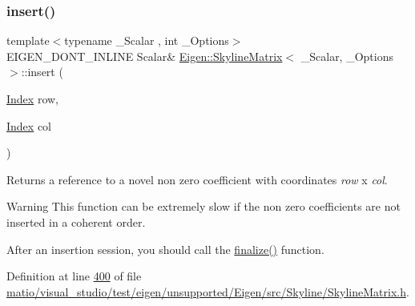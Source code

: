 \subsubsection{\texorpdfstring{insert()}{insert()}\hspace{0.1cm}{\footnotesize\ttfamily [1/2]}}
{\footnotesize\ttfamily template$<$typename \+\_\+\+Scalar , int \+\_\+\+Options$>$ \\
E\+I\+G\+E\+N\+\_\+\+D\+O\+N\+T\+\_\+\+I\+N\+L\+I\+NE Scalar\& \hyperlink{class_eigen_1_1_skyline_matrix}{Eigen\+::\+Skyline\+Matrix}$<$ \+\_\+\+Scalar, \+\_\+\+Options $>$\+::insert (\begin{DoxyParamCaption}\item[{\hyperlink{group___core___module_a554f30542cc2316add4b1ea0a492ff02}{Index}}]{row,  }\item[{\hyperlink{group___core___module_a554f30542cc2316add4b1ea0a492ff02}{Index}}]{col }\end{DoxyParamCaption})\hspace{0.3cm}{\ttfamily [inline]}}

\begin{DoxyReturn}{Returns}
a reference to a novel non zero coefficient with coordinates {\itshape row} x {\itshape col}.
\end{DoxyReturn}
\begin{DoxyWarning}{Warning}
This function can be extremely slow if the non zero coefficients are not inserted in a coherent order.
\end{DoxyWarning}
After an insertion session, you should call the \hyperlink{class_eigen_1_1_skyline_matrix_a1269310d041fb3ca2a980644f3cfe5a2}{finalize()} function. 

Definition at line \hyperlink{matio_2visual__studio_2test_2eigen_2unsupported_2_eigen_2src_2_skyline_2_skyline_matrix_8h_source_l00400}{400} of file \hyperlink{matio_2visual__studio_2test_2eigen_2unsupported_2_eigen_2src_2_skyline_2_skyline_matrix_8h_source}{matio/visual\+\_\+studio/test/eigen/unsupported/\+Eigen/src/\+Skyline/\+Skyline\+Matrix.\+h}.

\mbox{\label{class_eigen_1_1_skyline_matrix_a6e2d550f29d0dd59f83aa9d568d92c23}} 
